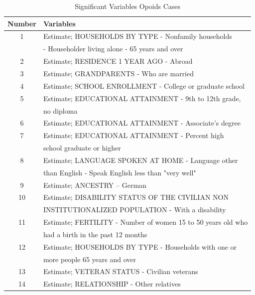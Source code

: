 \documentclass{mcmthesis}
\numberwithin{equation}{section}
\numberwithin{figure}{section}
\numberwithin{table}{section}
\theoremstyle{mydef}
\begin{document}
\begin{table}[htbp]
  \centering
  \caption{Significant Variables Opoids Cases}
    \begin{tabular}{cl}
    \addlinespace
    \toprule[1.5pt]
    Number & Variables \\
    \midrule[1pt]
    
    1     & Estimate; HOUSEHOLDS BY TYPE - Nonfamily households\\
    & - Householder living alone - 65 years and over \\
    2     & Estimate; RESIDENCE 1 YEAR AGO - Abroad \\
    3     & Estimate; GRANDPARENTS - Who are married \\
    4     & Estimate; SCHOOL ENROLLMENT - College or graduate school \\
    5     & Estimate; EDUCATIONAL ATTAINMENT - 9th to 12th grade, \\
    &no diploma \\
    6     & Estimate; EDUCATIONAL ATTAINMENT - Associate's degree \\
    7     & Estimate; EDUCATIONAL ATTAINMENT - Percent high \\
    & school graduate or higher \\
    8     & Estimate; LANGUAGE SPOKEN AT HOME - Language other \\
    &than English - Speak English less than "very well" \\
        9     & Estimate; ANCESTRY – German \\
    10     & Estimate; DISABILITY STATUS OF THE CIVILIAN NON\\ & INSTITUTIONALIZED  POPULATION - With a disability \\
   11     & Estimate; FERTILITY - Number of women 15 to 50 years old who\\
    & had a birth in the past 12 months \\
    12     & Estimate; HOUSEHOLDS BY TYPE - Households with one or \\
    &more people 65 years and over \\
    13     & Estimate; VETERAN STATUS - Civilian veterans \\
    14     & Estimate; RELATIONSHIP - Other relatives \\

    \bottomrule[1.5pt]
    \end{tabular}%
  \label{tab:memo}%
\end{table}%
\end{document}
